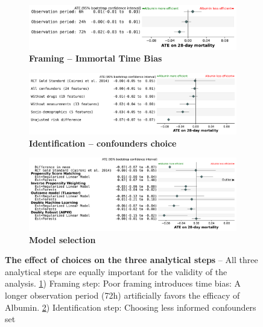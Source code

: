 \documentclass[10pt,letterpaper]{article}
\begin{document}
\begin{figure}[h!]
    \begin{subfigure}[b]{\linewidth}
        \caption{\bfseries Framing -- Immortal Time Bias}\label{fig:vibration:itb}
        \includegraphics[width=0.765\linewidth, right]{img/itb__dr_forest_agg_first_last__bs_30_shared_x_axis.pdf}
    \end{subfigure}
    \vfill
    \begin{subfigure}[b]{\linewidth}
        \centering
        \caption{\bfseries Identification -- confounders choice}\label{fig:vibration:confounders}
        \includegraphics[width=.9\linewidth, right]{img/sensitivity_confounders_main_shared_x_axis.pdf}
    \end{subfigure}
    \vfill
    \begin{subfigure}[b]{\linewidth}
        \centering
        \caption{\bfseries Model selection}\label{fig:vibration:models}
        \includegraphics[width=0.891\linewidth, right]{img/estimates_20230712__est_lr_rf__bs_50_shared_x_axis.pdf}
    \end{subfigure}
    \vfill
    \caption{\textbf{The effect of choices on the three
            analytical steps} -- All three
        analytical steps are equally important for the validity of the analysis.
        \ref{fig:vibration:itb}) Framing step: Poor framing introduces time bias: A longer
        observation period (72h) artificially favors the efficacy of Albumin.
        \ref{fig:vibration:confounders}) Identification step: Choosing less informed confounders set
}
\end{figure}
\end{document}
